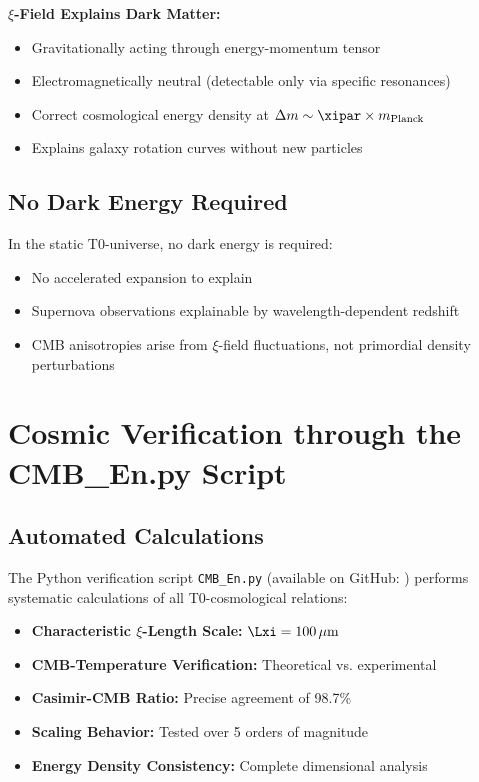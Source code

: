 	\begin{keyresult}
		\textbf{$\xi$-Field Explains Dark Matter:}
		
		\begin{itemize}
			\item Gravitationally acting through energy-momentum tensor
			\item Electromagnetically neutral (detectable only via specific resonances)
			\item Correct cosmological energy density at $\Delta m \sim \xipar \times m_{\text{Planck}}$
			\item Explains galaxy rotation curves without new particles
		\end{itemize}
	\end{keyresult}
	
	\subsection{No Dark Energy Required}
	
	In the static T0-universe, no dark energy is required:
	
	\begin{itemize}
		\item No accelerated expansion to explain
		\item Supernova observations explainable by wavelength-dependent redshift
		\item CMB anisotropies arise from $\xi$-field fluctuations, not primordial density perturbations
	\end{itemize}
	
	\section{Cosmic Verification through the CMB\_En.py Script}
	
	\subsection{Automated Calculations}
	
	The Python verification script \texttt{CMB\_En.py} (available on GitHub: ) performs systematic calculations of all T0-cosmological relations:
	
	\begin{itemize}
		\item \textbf{Characteristic $\xi$-Length Scale:} $\Lxi = 100\,\mu\text{m}$
		\item \textbf{CMB-Temperature Verification:} Theoretical vs. experimental
		\item \textbf{Casimir-CMB Ratio:} Precise agreement of 98.7\%
		\item \textbf{Scaling Behavior:} Tested over 5 orders of magnitude
		\item \textbf{Energy Density Consistency:} Complete dimensional analysis
	\end{itemize}
	
